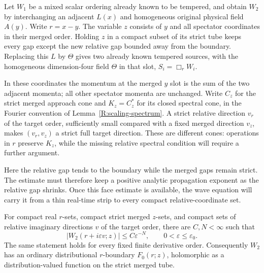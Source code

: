 Let $W_1$ be a mixed scalar ordering already known to be tempered,
and obtain $W_2$ by interchanging an adjacent $L(x)$ and homogeneous
original physical field
$A(y)$.  Write $r=x-y$.  The variable $z$ consists of $y$ and all
spectator coordinates in their merged order.  Holding $z$ in a compact
subset of its strict tube keeps every gap except the new relative
gap bounded away from the boundary.  Replacing this $L$ by $\Theta$
gives two already known tempered sources, with the homogeneous
dimension-four field $\Theta$ in that slot,
$S_i=\Box_rW_i$.

In these coordinates the momentum at the merged $y$ slot is the sum
of the two adjacent momenta; all other spectator momenta are unchanged.
Write $C_z$ for the strict merged approach cone and $K_z=C_z^*$ for
its closed spectral cone, in the Fourier convention of
Lemma~\ref{R:scaling-spectrum}.  A strict relative direction $v_r$
of the target order, sufficiently small compared with a fixed merged
direction $v_z$, makes $(v_r,v_z)$ a strict full target direction.
These are different cones: operations in $r$ preserve $K_z$, while
the missing relative spectral condition will require a further argument.

Here the relative gap tends to the boundary while the merged gaps
remain strict.  The estimate must therefore keep a positive analytic
propagation exponent as the relative gap shrinks.  Once this face
estimate is available, the wave equation will carry it from a thin
real-time strip to every compact relative-coordinate set.

\begin{lemma}\label{R:face-bound}
For compact real $r$-sets, compact strict merged $z$-sets, and compact
sets of relative imaginary directions $v$ of the target order, there
are $C,N<\infty$ such that
\begin{equation}\label{R:face-power}
 |W_2(r+i\varepsilon v;z)|\leq C\varepsilon^{-N},
 \qquad 0<\varepsilon\leq\varepsilon_0.
\end{equation}
The same statement holds for every fixed finite derivative order.
Consequently $W_2$ has an ordinary distributional $r$-boundary
$F_0(r;z)$, holomorphic as a distribution-valued function on the strict
merged tube.
\end{lemma}

